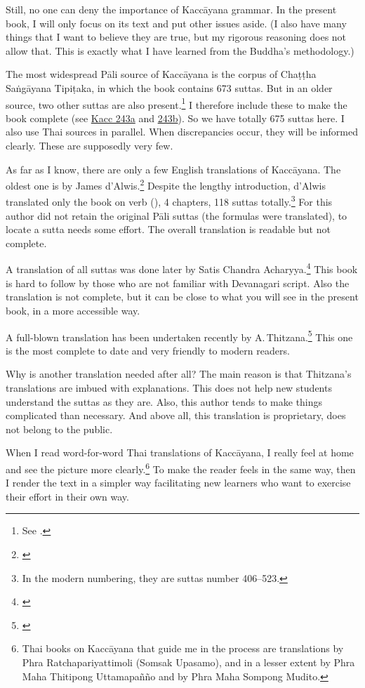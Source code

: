 Still, no one can deny the importance of Kaccāyana grammar. In the present book, I will only focus on its text and put other issues aside. (I also have many things that I want to believe they are true, but my rigorous reasoning does not allow that. This is exactly what I have learned from the Buddha's methodology.) 

The most widespread Pāli source of Kaccāyana is the corpus of Chaṭṭha Saṅgāyana Tipiṭaka, in which the book contains 673 suttas. But in an older source, two other suttas are also present.\footnote{See \citealp[p.~221]{thitzana:kacc1}.} I therefore include these to make the book complete (see \hyperref[sut:243a]{Kacc 243a} and \hyperref[sut:243b]{243b}). So we have totally 675 suttas here. I also use Thai sources in parallel. When discrepancies occur, they will be informed clearly. These are supposedly very few.

As far as I know, there are only a few English translations of Kaccāyana. The oldest one is by James d'Alwis.\footnote{\citealp{dalwis:kach}} Despite the lengthy introduction, d'Alwis translated only the book on verb (), 4 chapters, 118 suttas totally.\footnote{In the modern numbering, they are suttas number 406--523.} For this author did not retain the original Pāli suttas (the formulas were translated), to locate a sutta needs some effort. The overall translation is readable but not complete.

A translation of all suttas was done later by Satis Chandra Acharyya.\footnote{\citealp{satis:kacc}} This book is hard to follow by those who are not familiar with Devanagari script. Also the translation is not complete, but it can be close to what you will see in the present book, in a more accessible way.

A full-blown translation has been undertaken recently by A.\,Thitzana.\footnote{\citealp{thitzana:kacc2}} This one is the most complete to date and very friendly to modern readers.

Why is another translation needed after all? The main reason is that Thitzana's translations are imbued with explanations. This does not help new students understand the suttas as they are. Also, this author tends to make things complicated than necessary. And above all, this translation is proprietary, does not belong to the public.

When I read word-for-word Thai translations of Kaccāyana, I really feel at home and see the picture more clearly.\footnote{Thai books on Kaccāyana that guide me in the process are translations by Phra Ratchapariyattimoli (Somsak Upasamo), and in a lesser extent by Phra Maha Thitipong Uttamapañño and by Phra Maha Sompong Mudito.} To make the reader feels in the same way, then I render the text in a simpler way facilitating new learners who want to exercise their effort in their own way.

